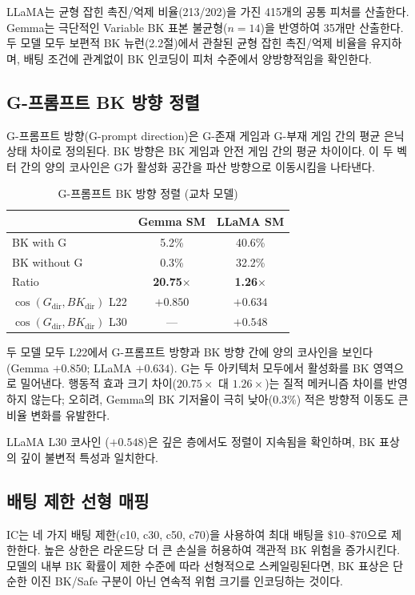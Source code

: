 \documentclass[11pt,a4paper]{article}
\begin{document}
\noindent LLaMA는 균형 잡힌 촉진/억제 비율(213/202)을 가진 415개의 공통 피처를 산출한다. Gemma는 극단적인 Variable BK 표본 불균형($n=14$)을 반영하여 35개만 산출한다. 두 모델 모두 보편적 BK 뉴런(2.2절)에서 관찰된 균형 잡힌 촉진/억제 비율을 유지하며, 배팅 조건에 관계없이 BK 인코딩이 피처 수준에서 양방향적임을 확인한다.

\subsection{G-프롬프트 BK 방향 정렬}

G-프롬프트 방향(G-prompt direction)은 G-존재 게임과 G-부재 게임 간의 평균 은닉 상태 차이로 정의된다. BK 방향은 BK 게임과 안전 게임 간의 평균 차이이다. 이 두 벡터 간의 양의 코사인은 G가 활성화 공간을 파산 방향으로 이동시킴을 나타낸다.

\begin{table}[H]
\centering
\caption{G-프롬프트 BK 방향 정렬 (교차 모델)}\label{tab:t16}
\footnotesize
\begin{tabular}{lcc}
\toprule
 & Gemma SM & LLaMA SM \\
\midrule
BK with G & 5.2\% & 40.6\% \\
BK without G & 0.3\% & 32.2\% \\
Ratio & \textbf{20.75$\times$} & \textbf{1.26$\times$} \\
$\cos(G_\mathrm{dir}, BK_\mathrm{dir})$ L22 & $\mathbf{+0.850}$ & $\mathbf{+0.634}$ \\
$\cos(G_\mathrm{dir}, BK_\mathrm{dir})$ L30 & --- & $\mathbf{+0.548}$ \\
\bottomrule
\end{tabular}
\end{table}

\noindent 두 모델 모두 L22에서 G-프롬프트 방향과 BK 방향 간에 양의 코사인을 보인다 (Gemma $+0.850$; LLaMA $+0.634$). G는 두 아키텍처 모두에서 활성화를 BK 영역으로 밀어낸다. 행동적 효과 크기 차이($20.75\times$ 대 $1.26\times$)는 질적 메커니즘 차이를 반영하지 않는다; 오히려, Gemma의 BK 기저율이 극히 낮아(0.3\%) 적은 방향적 이동도 큰 비율 변화를 유발한다.

\medskip\noindent LLaMA L30 코사인 ($+0.548$)은 깊은 층에서도 정렬이 지속됨을 확인하며, BK 표상의 깊이 불변적 특성과 일치한다.

\subsection{배팅 제한 선형 매핑}

IC는 네 가지 배팅 제한(c10, c30, c50, c70)을 사용하여 최대 배팅을 \$10--\$70으로 제한한다. 높은 상한은 라운드당 더 큰 손실을 허용하여 객관적 BK 위험을 증가시킨다. 모델의 내부 BK 확률이 제한 수준에 따라 선형적으로 스케일링된다면, BK 표상은 단순한 이진 BK/Safe 구분이 아닌 연속적 위험 크기를 인코딩하는 것이다.
\end{document}
